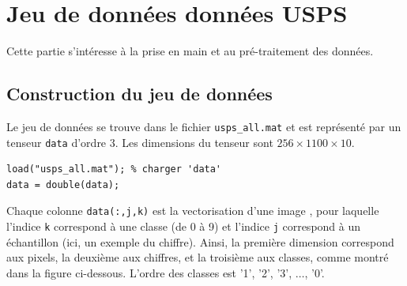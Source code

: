 \section{Jeu de données données USPS}

Cette partie s'intéresse à la prise en main et au pré-traitement des données.

\subsection{Construction du jeu de données}
Le jeu de données se trouve dans le fichier \texttt{usps\_all.mat} et est représenté par un tenseur \texttt{data} d'ordre $3$. Les dimensions du tenseur sont $256\times 1100 \times 10$.

\begin{lstlisting}
load("usps_all.mat"); % charger 'data'
data = double(data);
\end{lstlisting}

Chaque colonne \texttt{data(:,j,k)} est la vectorisation d'une image , pour laquelle l'indice \texttt{k} correspond à une classe (de 0 à 9) et l'indice \texttt{j} correspond à un échantillon (ici, un exemple du chiffre). Ainsi, la première dimension correspond aux pixels, la deuxième aux chiffres, et la troisième aux classes, comme montré dans la figure ci-dessous. L'ordre des classes est '1', '2', '3', $\ldots$, '0'.

\begin{center}
\end{center}


